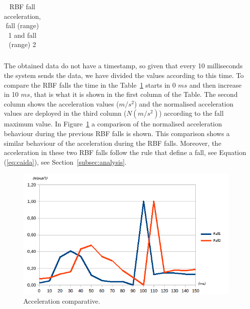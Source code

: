\documentclass[journal]{IEEEtran}
\begin{document}
\begin{table}[!ht]
 \centering
 \begin{tabular}{*{5}{r}}
   
 \end{tabular}
 \caption{RBF fall acceleration, fall (range) 1 and fall (range) 2}%
 \label{tabla:RBF}
\end{table}

The obtained data do not have a timestamp, so given that every 10 milliseconds the system sends the data, we have
divided the values according to this time. To compare the RBF falls the time in the Table~\ref{tabla:RBF} 
starts in 0 $ms$ and then increase in 10 $ms$, that is what it is shown in 
the first column of the Table. The second column shows the acceleration values ($m/s^2$) and the normalised acceleration values
are deployed in the third column ($N(m/s^2)$) according to the fall maximum value. In 
Figure~\ref{fig:Sensor1} a comparison of the normalised acceleration behaviour during the previous RBF falls is shown. 
This comparison shows a similar behaviour of the acceleration during the RBF falls.
Moreover, the acceleration in these two RBF falls follow the rule that define a fall, see Equation (\ref{eq:caida}), 
see Section~\ref{subsec:analysis}.

\begin{figure}[!ht]
  \centering
  \includegraphics[scale=0.45]{img/Comparativa}
  \caption[Acceleration comparative]{Acceleration comparative.}
  \label{fig:Sensor1}
\end{figure}
\end{document}
